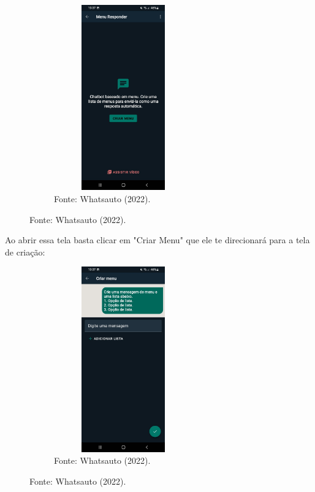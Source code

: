 \begin{itemize}
\begin{figure}[!htb]
\centering
\captionsetup[subfigure]{labelformat=empty}
\caption{``Menu 1''}
\begin{subfigure}{.5\textwidth}
\centering
\includegraphics[width=6cm,height=8cm]{Bot/Partes/Imagens/Menu 1.jpeg}
\caption{Fonte: Whatsauto (2022).}
\end{subfigure}%
\end{figure}

        Ao abrir essa tela basta clicar em "Criar Menu" que ele te direcionará para a tela de criação:

\begin{figure}[!htb]
\centering
\captionsetup[subfigure]{labelformat=empty}
\caption{``Menu 2''}
\begin{subfigure}{.5\textwidth}
\centering
\includegraphics[width=6cm,height=8cm]{Bot/Partes/Imagens/Menu 2.jpeg}
\caption{Fonte: Whatsauto (2022).}
\end{subfigure}%
\end{figure}


\end{itemize}
